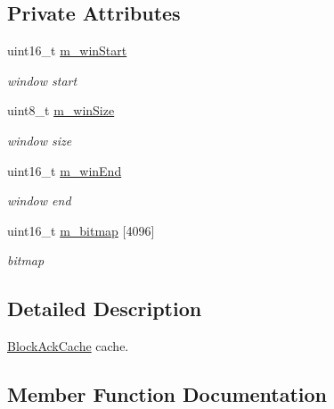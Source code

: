 \subsection*{Private Attributes}
\begin{DoxyCompactItemize}
\item 
uint16\+\_\+t \hyperlink{classns3_1_1BlockAckCache_a9504918377f4305f833737fcd62b45e6}{m\+\_\+win\+Start}
\begin{DoxyCompactList}\small\item\em window start \end{DoxyCompactList}\item 
uint8\+\_\+t \hyperlink{classns3_1_1BlockAckCache_a5470178ccc3e62bd726eddf977a4cb00}{m\+\_\+win\+Size}
\begin{DoxyCompactList}\small\item\em window size \end{DoxyCompactList}\item 
uint16\+\_\+t \hyperlink{classns3_1_1BlockAckCache_ad4e4e1d170e58228b784ce9e4dda90db}{m\+\_\+win\+End}
\begin{DoxyCompactList}\small\item\em window end \end{DoxyCompactList}\item 
uint16\+\_\+t \hyperlink{classns3_1_1BlockAckCache_adb1f98382f23dc2cde731c9d4ddc4d6a}{m\+\_\+bitmap} \mbox{[}4096\mbox{]}
\begin{DoxyCompactList}\small\item\em bitmap \end{DoxyCompactList}\end{DoxyCompactItemize}


\subsection{Detailed Description}
\hyperlink{classns3_1_1BlockAckCache}{Block\+Ack\+Cache} cache. 

\subsection{Member Function Documentation}
